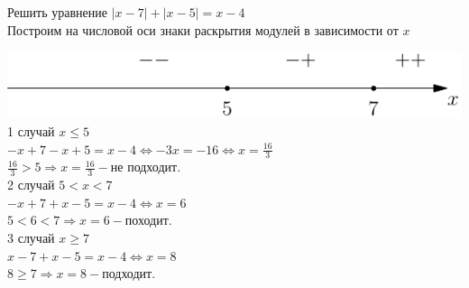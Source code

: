  Решить уравнение $|x-7|+|x-5|=x-4$\\
Построим на числовой оси знаки раскрытия модулей в зависимости от $x$\\
\begin{center}
\includegraphics[scale =1]{7.pdf}\\
1 случай $x\leqslant5$\\
$-x+7-x+5=x-4 \Leftrightarrow -3x=-16\Leftrightarrow x=\frac{16}3$\\
$\frac{16}3>5 \Rightarrow x=\frac{16}3 - \text{не подходит.}$\\
2 случай $5<x<7$\\
$-x+7+x-5=x-4 \Leftrightarrow x=6$\\
$5<6<7 \Rightarrow x=6 - \text{походит.}$\\
3 случай $x\geqslant 7$\\
$x-7+x-5=x-4 \Leftrightarrow x=8$\\
$8\geqslant7 \Rightarrow x=8 - \text{подходит.}$\\
\end{center}

